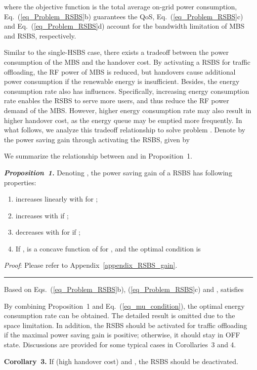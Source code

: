 \documentclass[12pt, draftclsnofoot,onecolumn]{IEEEtran}
\begin{document}
where the objective function is the total average on-grid power consumption, Eq.~(\ref{eq_Problem_RSBS}b) guarantees the QoS, Eq.~(\ref{eq_Problem_RSBS}c) and Eq.~(\ref{eq_Problem_RSBS}d) account for the bandwidth limitation of MBS and RSBS, respectively.

Similar to the single-HSBS case, there exists a tradeoff between the power consumption of the MBS and the handover cost.
By activating a RSBS for traffic offloading, the RF power of MBS is reduced, but handovers cause additional power consumption if the renewable energy is insufficient.
Besides, the energy consumption rate also has influences.
Specifically, increasing energy consumption rate enables the RSBS to serve more users, and thus reduce the RF power demand of the MBS.
However, higher energy consumption rate may also result in higher handover cost, as the energy queue may be emptied more frequently.
In what follows, we analyze this tradeoff relationship to solve problem .
Denote by  the power saving gain through activating the RSBS, given by

We summarize the relationship between  and  in Proposition~1.

\emph{\textbf{Proposition~1.}} Denoting , the power saving gain of a RSBS  has following properties:
\begin{enumerate}
  \item  increases linearly with  for ;
  \item  increases with  if  ;
  \item  decreases with  for  if  ;
  \item If ,  is a concave function of  for , and the optimal condition is
      
\end{enumerate}
\emph{Proof}: Please refer to Appendix~\ref{appendix_RSBS_gain}.
\hfill \rule{4pt}{8pt}

Based on Eqs.~(\ref{eq_Problem_RSBS}b), (\ref{eq_Problem_RSBS}c) and ,  satisfies

By combining Proposition~1 and Eq.~(\ref{eq_mu_condition}), the optimal energy consumption rate can be obtained.
The detailed result is omitted due to the space limitation.
In addition, the RSBS should be activated for traffic offloading if the maximal power saving gain is positive; otherwise, it should stay in OFF state.
Discussions are provided for some typical cases in Corollaries~3 and 4.

\textbf{Corollary~3.} If  (high handover cost) and , the RSBS should be deactivated.
\end{document}
